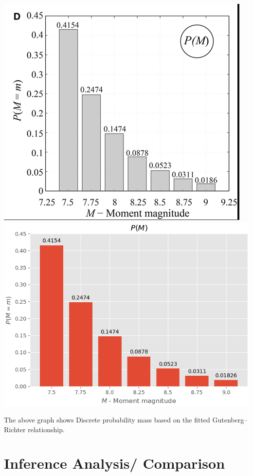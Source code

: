 \documentclass{article}
\begin{document}
\begin{itemize}
  \includegraphics[scale=0.5]{P(M).PNG} \includegraphics[scale=0.5]{plot_d.png}

  The above graph shows  Discrete probability mass based on the fitted Gutenberg–Richter relationship.\cite{cite3}
\end{itemize}
\newpage
\section{Inference Analysis/ Comparison}
\end{document}
